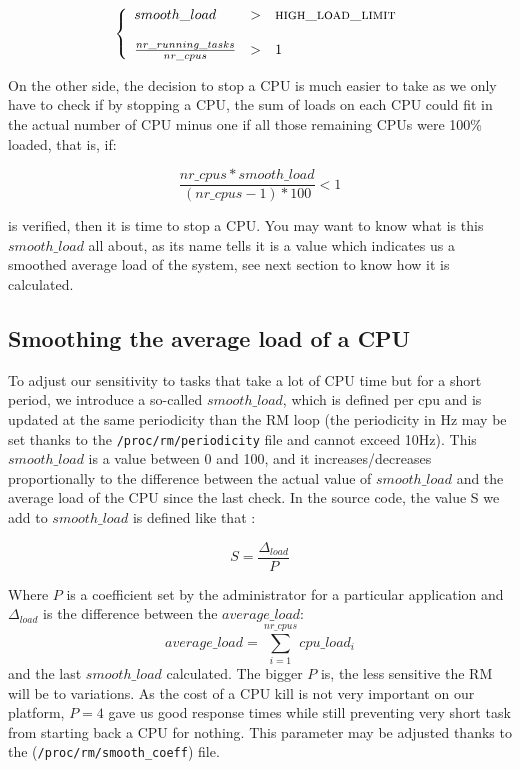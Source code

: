 \documentclass{report}
\renewcommand{\tt}[1]{\texttt{{{#1}}}}
\begin{document}
\[
\left\{
\begin{array}{lrl}
smooth\_load & > & \textsc{high\_load\_limit} \\
 & & \\
\frac{nr\_running\_tasks}{nr\_cpus} & > &  1
\end{array}
\right.
\]

On the other side, the decision to stop a CPU is much easier to take as we only
have to check if by stopping a CPU, the sum of loads on each CPU could fit in
the actual number of CPU minus one if all those remaining CPUs were 100\%
loaded, that is, if:

\[ \frac{nr\_cpus * smooth\_load}{(nr\_cpus - 1) * 100} < 1 \]

is verified, then it is time to stop a CPU. You may want to know what is this
$smooth\_load$ all about, as its name tells it is a value which indicates us a
smoothed average load of the system, see next section to know how it is
calculated.

\subsection{Smoothing the average load of a CPU}

To adjust our sensitivity to tasks that take a lot of CPU time but for a short
period, we introduce a so-called $smooth\_load$, which is defined per cpu and
is updated at the same periodicity than the RM loop (the periodicity in Hz may
be set thanks to the \tt{/proc/rm/periodicity} file and cannot exceed
10Hz). This $smooth\_load$ is a value between 0 and 100, and it
increases/decreases proportionally to the difference between the actual value
of $smooth\_load$ and the average load of the CPU since the last check. In the
source code, the value S we add to $smooth\_load$ is defined like that :

\[ S = \frac{\Delta_{load}}{P} \]

Where $P$ is a coefficient set by the administrator for a particular
application and $\Delta_{load}$ is the difference between the $average\_load$:
\[average\_load = \sum_{i=1}^{nr\_cpus} cpu\_load_i\]
and the last $smooth\_load$ calculated. The bigger $P$ is, the less sensitive
the RM will be to variations. As the cost of a CPU kill is not very important
on our platform, $P = 4$ gave us good response times while still preventing
very short task from starting back a CPU for nothing. This parameter may be
adjusted thanks to the (\tt{/proc/rm/smooth\_coeff}) file.
\end{document}
